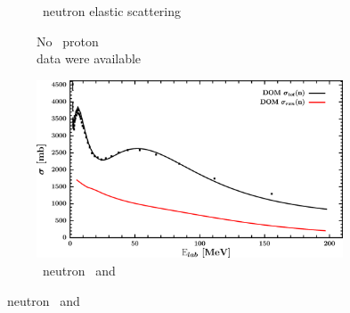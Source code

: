 \begin{figure}[hbtp]
\begin{subfigure}[c]{0.39\textheight}
        \caption{\niEight\ neutron elastic scattering}
        \label{DOMFitData_ni58_neutron_elastic}
    \end{subfigure}\vspace{0.70in}
    \begin{subfigure}[c]{0.45\textwidth}
        \centering
        \caption{No \niEight\ proton \rxn\\ data were available}
        \label{DOMFitData_ni58_proton_inelastic}
    \end{subfigure}\hspace{6pt}
    \begin{subfigure}[c]{0.45\textwidth}
        \centering
        \includegraphics[width=\linewidth]{figures/ni58_neutronInelastic.png}
        \caption{\niEight\ neutron \rxn\ and \tot}
        \label{DOMFitData_ni58_neutron_inelastic}
    \end{subfigure}
\end{figure}
\afterpage{\clearpage}
